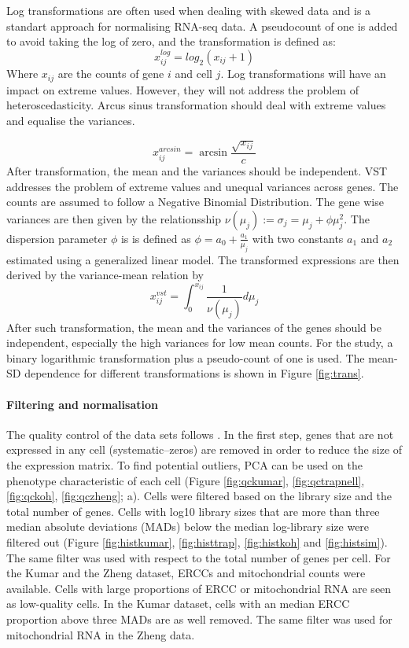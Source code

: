 \documentclass[12pt, a4paper]{article}\usepackage[]{graphicx}\usepackage[]{color}
\begin{document}
Log transformations are often used when dealing with skewed data and is a standart approach for normalising RNA-seq data. A pseudocount of one is added to avoid taking the log of zero, and the transformation is defined as:
\begin{equation}
x_{ij}^{log} = log_{2}(x_{ij} + 1)
\end{equation}
Where $x_{ij}$ are the counts of gene $i$ and cell $j$. Log transformations will have an impact on extreme values. However, they will not address the problem of heteroscedasticity. Arcus sinus transformation should deal with extreme values and equalise the variances. 

\begin{equation}
x_{ij}^{arcsin} = \arcsin \frac{\sqrt{x_{ij}} }{c}
\end{equation}
After transformation, the mean and the variances should be independent. 
VST addresses the problem of extreme values and unequal variances across genes. The counts are assumed to follow a Negative Binomial Distribution. The gene wise variances are then given by the relationsship $\nu(\mu_j) := \sigma_{j}=\mu_j + \phi\mu_{j}^2 $. The dispersion parameter $\phi$ is is defined as $\phi=a_{0} + \frac{a_{1}}{\mu_{j}}$ with two constants $a_{1}$ and $a_{2}$ estimated using a generalized linear model. 
The transformed expressions are then derived by the variance-mean relation by
\begin{equation}
x_{ij}^{vst} = \int_{0}^{x_{ij}} \frac{1}{\nu(\mu_j)} d\mu_j
\end{equation}
After such transformation, the mean and the variances of the genes should be independent, especially the high variances for low mean counts.  For the study, a binary logarithmic transformation plus a pseudo-count of one is used.  The mean-SD dependence for different transformations is shown in Figure \ref{fig:trans}.

\newpage
\paragraph{Filtering and normalisation}
The quality control of the data sets follows \citet{lun2016step}. In the first step, genes that are not expressed in any cell (systematic--zeros) are removed in order to reduce the size of the expression matrix. To find potential outliers, PCA can be used on the phenotype characteristic of each cell (Figure \ref{fig:qckumar}, \ref{fig:qctrapnell}, \ref{fig:qckoh}, \ref{fig:qczheng}; a). Cells were filtered based on the library size and the total number of genes.
Cells with log10 library sizes that are more than three median absolute deviations (MADs) below the median log-library size were filtered out (Figure \ref{fig:histkumar}, \ref{fig:histtrap}, \ref{fig:histkoh} and \ref{fig:histsim}). The same filter was used with respect to the total number of genes per cell. 
For the Kumar and the Zheng dataset, ERCCs and mitochondrial counts were available. Cells with large proportions of ERCC or mitochondrial RNA are seen as low-quality cells. In the Kumar dataset, cells with an median ERCC proportion above three MADs are as well removed. The same filter was used for mitochondrial RNA in the Zheng data.
\end{document}
